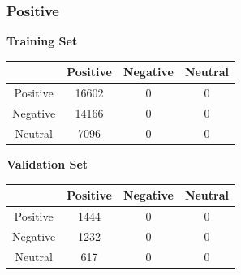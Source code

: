 \documentclass[12pt,a4paper]{article}
\begin{document}
\subsubsection{Positive}

\textbf{Training Set}
\begin{center}
\begin{tabular}{|c|c|c|c|}
\hline
 & Positive & Negative & Neutral \\
\hline
Positive & 16602 & 0 & 0 \\
\hline
Negative & 14166 & 0 & 0 \\
\hline
Neutral & 7096 & 0 & 0 \\
\hline
\end{tabular}
\end{center}

\textbf{Validation Set}
\begin{center}
\begin{tabular}{|c|c|c|c|}
\hline
 & Positive & Negative & Neutral \\
\hline
Positive & 1444 & 0 & 0 \\
\hline
Negative & 1232 & 0 & 0 \\
\hline
Neutral & 617 & 0 & 0 \\
\hline
\end{tabular}
\end{center}
\end{document}
